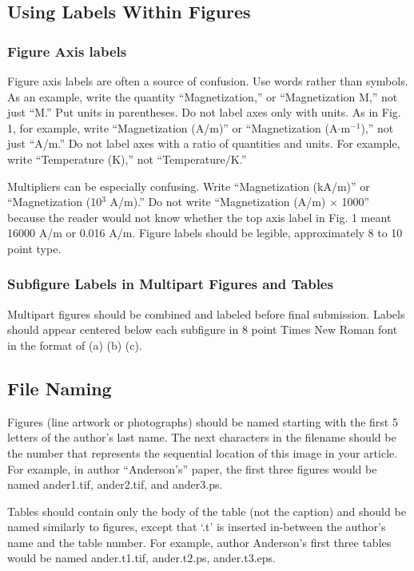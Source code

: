\subsection{Using Labels Within Figures}

\subsubsection{Figure Axis labels }
Figure axis labels are often a source of confusion. Use words rather than 
symbols. As an example, write the quantity ``Magnetization,'' or 
``Magnetization M,'' not just ``M.'' Put units in parentheses. Do not label 
axes only with units. As in Fig. 1, for example, write ``Magnetization 
(A/m)'' or ``Magnetization (A$\cdot$m$^{-1}$),'' not just ``A/m.'' Do not label axes with a ratio of quantities and 
units. For example, write ``Temperature (K),'' not ``Temperature/K.'' 

Multipliers can be especially confusing. Write ``Magnetization (kA/m)'' or 
``Magnetization (10$^{3}$ A/m).'' Do not write ``Magnetization 
(A/m)$\,\times\,$1000'' because the reader would not know whether the top 
axis label in Fig. 1 meant 16000 A/m or 0.016 A/m. Figure labels should be 
legible, approximately 8 to 10 point type.

\subsubsection{Subfigure Labels in Multipart Figures and Tables}
Multipart figures should be combined and labeled before final submission. 
Labels should appear centered below each subfigure in 8 point Times New 
Roman font in the format of (a) (b) (c). 

\subsection{File Naming}
Figures (line artwork or photographs) should be named starting with the 
first 5 letters of the author's last name. The next characters in the 
filename should be the number that represents the sequential 
location of this image in your article. For example, in author 
``Anderson's'' paper, the first three figures would be named ander1.tif, 
ander2.tif, and ander3.ps.

Tables should contain only the body of the table (not the caption) and 
should be named similarly to figures, except that `.t' is inserted 
in-between the author's name and the table number. For example, author 
Anderson's first three tables would be named ander.t1.tif, ander.t2.ps, 
ander.t3.eps.

